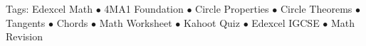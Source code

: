 \documentclass[11pt,a4paper]{article}
\begin{document}
\vspace{14pt}
\begin{center}
  \sffamily\scriptsize\textcolor{textmuted}{
    Tags: Edexcel Math $\bullet$ 4MA1 Foundation $\bullet$ Circle Properties $\bullet$ Circle Theorems $\bullet$ Tangents $\bullet$ Chords $\bullet$ Math Worksheet $\bullet$ Kahoot Quiz $\bullet$ Edexcel IGCSE $\bullet$ Math Revision
  }
\end{center}
\end{document}

